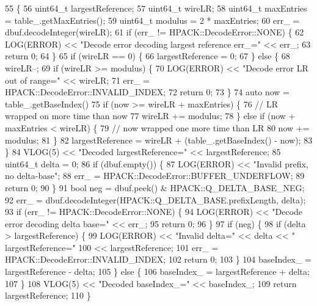 \begin{DoxyCode}
55                                                               \{
56   uint64\_t largestReference;
57   uint64\_t wireLR;
58   uint64\_t maxEntries = table_.getMaxEntries();
59   uint64\_t modulus = 2 * maxEntries;
60   err_ = dbuf.decodeInteger(wireLR);
61   \textcolor{keywordflow}{if} (err_ != HPACK::DecodeError::NONE) \{
62     LOG(ERROR) << \textcolor{stringliteral}{"Decode error decoding largest reference err\_="} << err_;
63     \textcolor{keywordflow}{return} 0;
64   \}
65   \textcolor{keywordflow}{if} (wireLR == 0) \{
66     largestReference = 0;
67   \} \textcolor{keywordflow}{else} \{
68     wireLR--;
69     \textcolor{keywordflow}{if} (wireLR >= modulus) \{
70       LOG(ERROR) << \textcolor{stringliteral}{"Decode error LR out of range="} << wireLR;
71       err_ = HPACK::DecodeError::INVALID_INDEX;
72       \textcolor{keywordflow}{return} 0;
73     \}
74     \textcolor{keyword}{auto} now = table_.getBaseIndex() %
75     \textcolor{keywordflow}{if} (now >= wireLR + maxEntries) \{
76       \textcolor{comment}{// LR wrapped on more time than now}
77       wireLR += modulus;
78     \} \textcolor{keywordflow}{else} \textcolor{keywordflow}{if} (now + maxEntries < wireLR) \{
79       \textcolor{comment}{// now wrapped one more time than LR}
80       now += modulus;
81     \}
82     largestReference = wireLR + (table_.getBaseIndex() - now);
83   \}
84   VLOG(5) << \textcolor{stringliteral}{"Decoded largestReference="} << largestReference;
85   uint64\_t delta = 0;
86   \textcolor{keywordflow}{if} (dbuf.empty()) \{
87     LOG(ERROR) << \textcolor{stringliteral}{"Invalid prefix, no delta-base"};
88     err_ = HPACK::DecodeError::BUFFER_UNDERFLOW;
89     \textcolor{keywordflow}{return} 0;
90   \}
91   \textcolor{keywordtype}{bool} neg = dbuf.peek() & HPACK::Q_DELTA_BASE_NEG;
92   err_ = dbuf.decodeInteger(HPACK::Q_DELTA_BASE.prefixLength, delta);
93   \textcolor{keywordflow}{if} (err_ != HPACK::DecodeError::NONE) \{
94     LOG(ERROR) << \textcolor{stringliteral}{"Decode error decoding delta base="} << err_;
95     \textcolor{keywordflow}{return} 0;
96   \}
97   \textcolor{keywordflow}{if} (neg) \{
98     \textcolor{keywordflow}{if} (delta > largestReference) \{
99       LOG(ERROR) << \textcolor{stringliteral}{"Invalid delta="} << delta << \textcolor{stringliteral}{" largestReference="}
100                  << largestReference;
101       err_ = HPACK::DecodeError::INVALID_INDEX;
102       \textcolor{keywordflow}{return} 0;
103     \}
104     baseIndex_ = largestReference - delta;
105   \} \textcolor{keywordflow}{else} \{
106     baseIndex_ = largestReference + delta;
107   \}
108   VLOG(5) << \textcolor{stringliteral}{"Decoded baseIndex\_="} << baseIndex_;
109   \textcolor{keywordflow}{return} largestReference;
110 \}
\end{DoxyCode}
